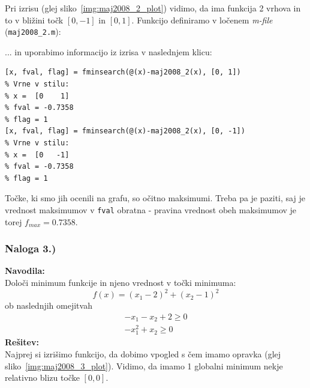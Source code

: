 \documentclass[a4paper,11pt]{article}
\begin{document}
Pri izrisu (glej sliko~\ref{img:maj2008_2_plot}) vidimo, da ima funkcija 2 vrhova in to v bližini točk $[0, -1]$ in $[0, 1]$. Funkcijo definiramo v ločenem \textit{m-file} (\texttt{maj2008\_2.m}):
 
... in uporabimo informacijo iz izrisa v naslednjem klicu:
\begin{lstlisting}
[x, fval, flag] = fminsearch(@(x)-maj2008_2(x), [0, 1])
% Vrne v stilu:
% x =  [0    1]
% fval = -0.7358
% flag = 1
[x, fval, flag] = fminsearch(@(x)-maj2008_2(x), [0, -1])
% Vrne v stilu:
% x =  [0   -1]
% fval = -0.7358
% flag = 1
\end{lstlisting}
Točke, ki smo jih ocenili na grafu, so očitno maksimumi. Treba pa je paziti, saj je vrednost maksimumov v \texttt{fval} obratna - pravina vrednost obeh maksimumov je torej $f_{max} = 0.7358$.


\subsubsection{Naloga 3.)}
\label{task:maj2008_3}

\textbf{Navodila:} \\
Določi minimum funkcije in njeno vrednost v točki minimuma:
\begin{equation} \label{eq:maj2008_3}
f(x) = (x_1 - 2)^2 + (x_2 - 1)^2
\end{equation}
ob naslednjih omejitvah
\begin{equation} \label{con:maj2008_3}
\begin{aligned}
-x_1 -x_2 + 2 \geq 0 \\
-x_1^2 + x_2 \geq 0
\end{aligned}
\end{equation}
\textbf{Rešitev:} \\
Najprej si izrišimo funkcijo, da dobimo vpogled s čem imamo opravka (glej sliko~\ref{img:maj2008_3_plot}). Vidimo, da imamo 1 globalni minimum nekje relativno blizu točke $[0, 0]$.
\end{document}
